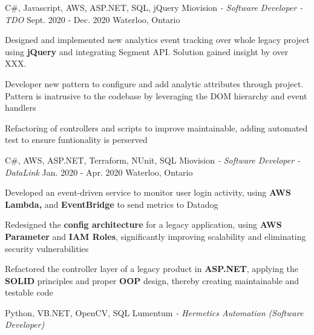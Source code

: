 \begin{siderules}
  \begin{cventries}
    \cventry
    {C\#, Javascript, AWS, ASP.NET, SQL, jQuery}
    {Miovision\hspace{0.15em} \bodyfontlight\itshape{- Software Developer - TDO}}
    {Sept. 2020 - Dec. 2020}
    {Waterloo, Ontario}
    {
      \begin{cvitems}
        \item {Designed and implemented new analytics event tracking over whole legacy project using \textbf{jQuery} and integrating Segment API. Solution gained insight by over XXX.}
        \item {Developer new pattern to configure and add analytic attributes through project. Pattern is inatrusive to the codebase by leveraging the DOM hierarchy and event handlers}
        \item {Refactoring of controllers and scripts to improve maintainable, adding automated test to ensure funtionality is perserved}
      \end{cvitems}
    }
    \cventry
    {C\#, AWS, ASP.NET, Terraform, NUnit, SQL}
    {Miovision\hspace{0.15em} \bodyfontlight\itshape{- Software Developer - DataLink}}
    {Jan. 2020 - Apr. 2020}
    {Waterloo, Ontario}
    {
      \begin{cvitems}
        \item {Developed an event-driven service to monitor user login activity, using \textbf{AWS Lambda,} and \textbf{EventBridge} to send metrics to Datadog}
        \item {Redesigned the \textbf{config architecture} for a legacy application, using \textbf{AWS Parameter} and \textbf{IAM Roles}, significantly improving scalability and eliminating security vulnerabilities}
        \item {Refactored the controller layer of a legacy product in \textbf{ASP.NET}, applying the \textbf{SOLID} principles and proper \textbf{OOP} design, thereby creating maintainable and testable code}
      \end{cvitems}
    }
    \cventry
      {Python, VB.NET, OpenCV, SQL}
      {Lumentum\hspace{0.15em} \bodyfontlight\itshape{- Hermetics Automation (Software Developer)}}

\end{cventries}
\end{siderules}
